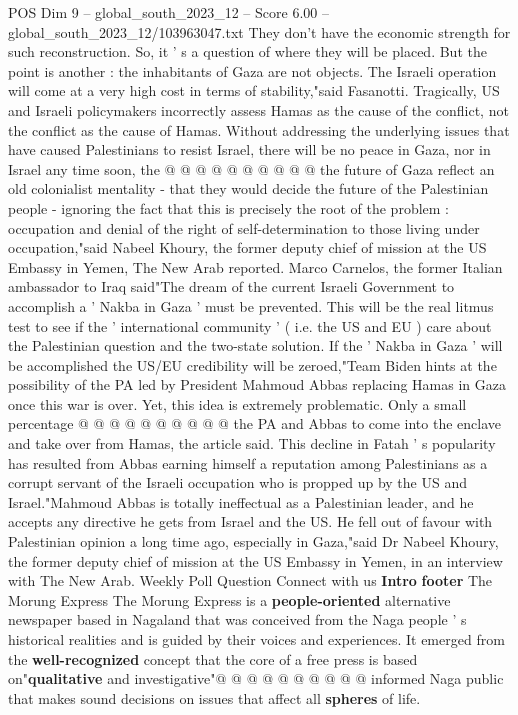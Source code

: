\begin{textsample}{POS Dim 9 – global\_south\_2023\_12 – Score 6.00 – global\_south\_2023\_12/103963047.txt}
They don't have the economic strength for such reconstruction.
So, it ' s a question of where they will be placed.
But the point is another : the inhabitants of Gaza are not objects.
The Israeli operation will come at a very high cost in terms of stability,"said Fasanotti.
Tragically, US and Israeli policymakers incorrectly assess Hamas as the cause of the conflict, not the conflict as the cause of Hamas.
Without addressing the underlying issues that have caused Palestinians to resist Israel, there will be no peace in Gaza, nor in Israel any time soon, the @ @ @ @ @ @ @ @ @ @ the future of Gaza reflect an old colonialist mentality - that they would decide the future of the Palestinian people - ignoring the fact that this is precisely the root of the problem : occupation and denial of the right of self-determination to those living under occupation,"said Nabeel Khoury, the former deputy chief of mission at the US Embassy in Yemen, The New Arab reported.
Marco Carnelos, the former Italian ambassador to Iraq said"The dream of the current Israeli Government to accomplish a ' Nakba in Gaza ' must be prevented.
This will be the real litmus test to see if the ' international community ' ( i.e. the US and EU ) care about the Palestinian question and the two-state solution.
If the ' Nakba in Gaza ' will be accomplished the US/EU credibility will be zeroed,"Team Biden hints at the possibility of the PA led by President Mahmoud Abbas replacing Hamas in Gaza once this war is over.
Yet, this idea is extremely problematic.
Only a small percentage @ @ @ @ @ @ @ @ @ @ the PA and Abbas to come into the enclave and take over from Hamas, the article said.
This decline in Fatah ' s popularity has resulted from Abbas earning himself a reputation among Palestinians as a corrupt servant of the Israeli occupation who is propped up by the US and Israel."Mahmoud Abbas is totally ineffectual as a Palestinian leader, and he accepts any directive he gets from Israel and the US.
He fell out of favour with Palestinian opinion a long time ago, especially in Gaza,"said Dr Nabeel Khoury, the former deputy chief of mission at the US Embassy in Yemen, in an interview with The New Arab.
Weekly Poll Question Connect with us \textbf{Intro} \textbf{footer} The Morung Express The Morung Express is a \textbf{people-oriented} alternative newspaper based in Nagaland that was conceived from the Naga people ' s historical realities and is guided by their voices and experiences.
It emerged from the \textbf{well-recognized} concept that the core of a free press is based on"\textbf{qualitative} and investigative"@ @ @ @ @ @ @ @ @ @ informed Naga public that makes sound decisions on issues that affect all \textbf{spheres} of life.

\end{textsample}
